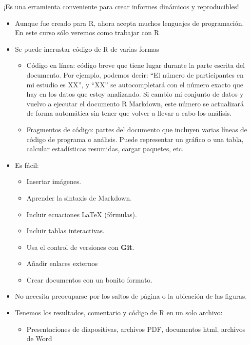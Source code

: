 \documentclass[
]{book}
\providecommand{\tightlist}{%
  \setlength{\itemsep}{0pt}\setlength{\parskip}{0pt}}
\begin{document}
¡Es una erramienta conveniente para crear informes dinámicos y reproducibles!

\begin{itemize}
\item
  Aunque fue creado para R, ahora acepta muchos lenguajes de programación. En este curso sólo veremos como trabajar con R
\item
  Se puede incrustar código de R de varias formas

  \begin{itemize}
  \tightlist
  \item
    Código en línea: código breve que tiene lugar durante la parte escrita del documento. Por ejemplo, podemos decir: ``El número de participantes en mi estudio es XX'', y ``XX'' se autocompletará con el número exacto que hay en los datos que estoy analizando. Si cambio mi conjunto de datos y vuelvo a ejecutar el documento R Markdown, este número se actualizará de forma automática sin tener que volver a llevar a cabo los análisis.
  \item
    Fragmentos de código: partes del documento que incluyen varias líneas de código de programa o análisis. Puede representar un gráfico o una tabla, calcular estadísticas resumidas, cargar paquetes, etc.
  \end{itemize}
\item
  Es fácil:

  \begin{itemize}
  \tightlist
  \item
    Insertar imágenes.
  \item
    Aprender la sintaxis de Markdown.
  \item
    Incluir ecuaciones LaTeX (fórmulas).
  \item
    Incluir tablas interactivas.
  \item
    Usa el control de versiones con \textbf{Git}.
  \item
    Añadir enlaces externos
  \item
    Crear documentos con un bonito formato.
  \end{itemize}
\item
  No necesita preocuparse por los saltos de página o la ubicación de las figuras.
\item
  Tenemos los resultados, comentario y código de R en un solo archivo:

  \begin{itemize}
  \tightlist
  \item
    Presentaciones de diapositivas, archivos PDF, documentos html, archivos de Word
  \end{itemize}
\end{itemize}
\end{document}

